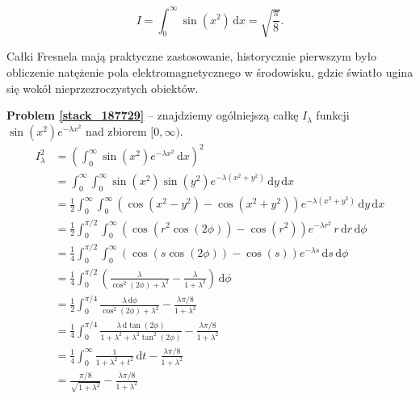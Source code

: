 %

\begin{problem_with_solution}
    \label{stack_187729}%
    \begin{equation}
        I = \int_0^\infty \sin (x^2) \,\mathrm{d} x = \sqrt{\frac \pi 8}.
    \end{equation}
\end{problem_with_solution}

Całki Fresnela mają praktyczne zastosowanie, historycznie pierwszym było obliczenie natężenie pola elektromagnetycznego w środowisku, gdzie światło ugina się wokół nieprzezroczystych obiektów.

\textbf{Problem \ref{stack_187729}} -- znajdziemy ogólniejszą całkę $I_\lambda$ funkcji $\sin(x^2) e^{-\lambda x^2}$ nad zbiorem $[0, \infty)$.
\begin{align}
    I_\lambda^2 & = \left(\int_0^\infty \sin(x^2) e^{-\lambda x^2} \,\mathrm{d}x \right)^2 \\
    & = \int_0^\infty \int_0^\infty \sin(x^2)\sin(y^2) e^{- \lambda(x^2+y^2)}\,\mathrm{d}y\,\mathrm{d}x \\
    & = \frac12 \int_0^\infty \int_0^\infty \left(\cos(x^2-y^2)-\cos(x^2+y^2)\right) e^{- \lambda(x^2+y^2)}\,\mathrm{d}y\,\mathrm{d}x \\
    & = \frac12 \int_0^{\pi/2} \int_0^\infty \left(\cos(r^2\cos(2\phi))-\cos(r^2)\right)e^{- \lambda r^2} \,r\,\mathrm{d}r\,\mathrm{d}\phi \\
    & = \frac14 \int_0^{\pi/2} \int_0^\infty \left(\cos(s\cos(2\phi))-\cos(s)\right) e^{- \lambda s} \,\mathrm{d}s\,\mathrm{d}\phi \\
    & = \frac14 \int_0^{\pi/2} \left( \frac{ \lambda}{\cos^2(2\phi)+ \lambda^2} - \frac{ \lambda}{1+ \lambda^2}\right)\,\mathrm{d}\phi \\
    & = \frac12 \int_0^{\pi/4} \frac{ \lambda\,\mathrm{d}\phi}{\cos^2(2\phi)+ \lambda^2} - \frac{ \lambda\pi/8}{1+ \lambda^2} \\
    & = \frac14 \int_0^{\pi/4} \frac{ \lambda\,\mathrm{d} \tan(2\phi)} {1+ \lambda^2+ \lambda^2 \tan^2(2\phi)} - \frac{ \lambda\pi/8}{1+ \lambda^2} \\
    & = \frac14 \int_0^\infty \frac1{1+ \lambda^2+t^2}\,\mathrm{d}t - \frac{ \lambda\pi/8}{1+ \lambda^2} \\
    & = \frac{\pi/8}{\sqrt{1+ \lambda^2}} - \frac{ \lambda\pi/8}{1+ \lambda^2}
\end{align}

%